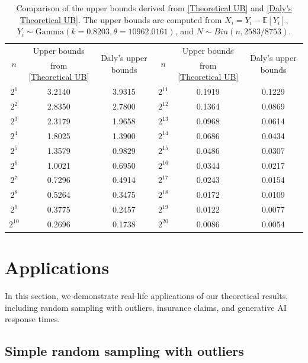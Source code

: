 \documentclass[pdflatex,sn-mathphys-ay]{sn-jnl}
\theoremstyle{thmstyleone}%
\theoremstyle{thmstyletwo}%
\theoremstyle{thmstylethree}%
\begin{document}
\newpage
\begin{table}[htbp]
\centering
\begin{tabular}{|c|c|c|c|c|c|}
\hline
\multirow{2}{*}{$n$}
& Upper bounds
& \multirow{2}{*}{Daly's upper bounds}
& \multirow{2}{*}{$n$}
& Upper bounds
& \multirow{2}{*}{Daly's upper bounds}
\\
& from \eqref{Theoretical UB}
&
&
& from \eqref{Theoretical UB}
&
\\
\hline
$2^1$  & 3.2140 & 3.9315 & $2^{11}$ & 0.1919 & 0.1229 \\
$2^2$  & 2.8350 & 2.7800 &$2^{12}$ & 0.1364 & 0.0869 \\
$2^3$  & 2.3179 & 1.9658 &$2^{13}$ & 0.0968 & 0.0614 \\
$2^4$  & 1.8025 & 1.3900 &$2^{14}$ & 0.0686 & 0.0434 \\
$2^5$  & 1.3579 & 0.9829 &$2^{15}$ & 0.0486 & 0.0307 \\
$2^6$  & 1.0021 & 0.6950 &$2^{16}$ & 0.0344 & 0.0217 \\
$2^7$  & 0.7296 & 0.4914 &$2^{17}$ & 0.0243 & 0.0154 \\
$2^8$  & 0.5264 & 0.3475 &$2^{18}$ & 0.0172 & 0.0109 \\
$2^9$  & 0.3775 & 0.2457 &$2^{19}$ & 0.0122 & 0.0077 \\
$2^{10}$ & 0.2696 & 0.1738 &$2^{20}$ & 0.0086 & 0.0054 \\
\hline
\end{tabular}
\caption{Comparison of the upper bounds derived from  \eqref{Theoretical UB} and  \eqref{Daly's Theoretical UB}. The upper bounds are computed from \( X_i = Y_i - \mathbb{E}[Y_i] \), \( Y_i \sim \mathrm{Gamma}(k = 0.8203, \theta = 10962.0161) \), 
and \( N \sim {Bin}(n, 2583/8753) \).}
\label{tab:daly_comparison}
\end{table}





\section{Applications} \label{sec:app}

In this section, we demonstrate real-life applications of our theoretical results, including random sampling with outliers, insurance claims, and generative AI response times.


\subsection{Simple random sampling with outliers}
\end{document}
